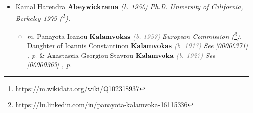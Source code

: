 \documentclass[10pt, openany]{book}
\begin{document}
\begin{itemize}
{\begin{itemize}
{\begin{itemize}
{\begin{itemize}
{\begin{itemize}
{\begin{itemize}
{\begin{itemize}
{{{BSc Hons) Physics).
Of the former Ceylon Civil Service. At the time of retirement was the Permenent Secretary to the Ministry of Planning and Plan Implementation. Later appointed Regional Director of the IPPF International Planned Parenthood Federation.) Appointed Chairman of SLICM Sri Lanka Institute of Cooperate Management). Resigned to do research on Epistomology. Wrote a book THE NATURE OF KNOWLEDGE in 1993.
Died in 2006 (\footnote{\url{http://archives.sundayobserver.lk/2006/02/26/obits.html}}).}} \textcolor{slteal}{\textit{See  \autoref{00000712} \textit{, p. \pageref{00000712} }}}  \&  Daphne Charlotte Elizabeth \textbf{Dissanayake} \textcolor{slorange}{\textit{(1923 - 2006)}} \textcolor{slmaroon}{\textit{Teacher (BA Lond). Trained Graduate.}} \textcolor{slteal}{\textit{See  \autoref{00000179} \textit{, p. \pageref{00000179} }}}   \label{couple:00000041:00000769} \begin{itemize}
\item{Devini Manouri \textbf{Senaratna} \textcolor{slorange}{\textit{(b. 1986)}} \textcolor{slmaroon}{\textit{Student Visakha Vidyalaya Colombo.}}
  }
\item{Nuwan Ishanta \textbf{Senaratna} \textcolor{slorange}{\textit{(b. 1982)}} \textcolor{slmaroon}{\textit{Student Royal College Colombo.
Computer Scientist (\footnote{\url{https://www.linkedin.com/in/nuwansenaratna/}}).
Compiler.}}
  }
\end{itemize}}
\end{itemize}
  }
\item{Kamal Harendra \textbf{Abeywickrama} \textcolor{slorange}{\textit{(b. 1950)}} \textcolor{slmaroon}{\textit{Ph.D. University of California, Berkeley 1979 (\footnote{\url{https://m.wikidata.org/wiki/Q102318937}}).}}
\begin{itemize}
\item{\textit{m.} Panayota Ioanou \textbf{Kalamvokas} \textcolor{gray}{\textit{(b. 195?)}} \textcolor{slmaroon}{\textit{European Commission (\footnote{\url{https://lu.linkedin.com/in/panayota-kalamvoka-16115336}}).}} Daughter of  Ioannis Constantinou \textbf{Kalamvokas} \textcolor{gray}{\textit{(b. 191?)}} \textcolor{slteal}{\textit{See  \autoref{00000371} \textit{, p. \pageref{00000371} }}}  \&  Anastassia Georgiou Stavrou \textbf{Kalamvoka} \textcolor{gray}{\textit{(b. 192?)}} \textcolor{slteal}{\textit{See  \autoref{00000363} \textit{, p. \pageref{00000363} }}}   \label{couple:00000038:00000375} \begin{itemize}

\end{itemize}}
\end{itemize}}
\end{itemize}}
\end{itemize}}
\end{itemize}}
\end{itemize}}
\end{itemize}}
\end{itemize}
\end{document}
